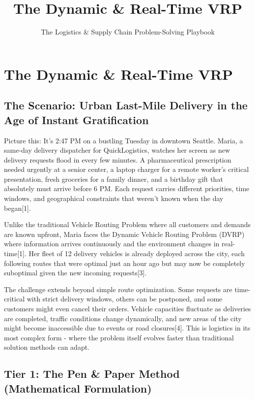 \documentclass{article}
\title{The Dynamic \& Real-Time VRP}
\author{The Logistics \& Supply Chain Problem-Solving Playbook}
\date{}
\begin{document}
\maketitle

\section{The Dynamic \& Real-Time VRP}

\subsection{The Scenario: Urban Last-Mile Delivery in the Age of Instant Gratification}

Picture this: It's 2:47 PM on a bustling Tuesday in downtown Seattle. Maria, a same-day delivery dispatcher for QuickLogistics, watches her screen as new delivery requests flood in every few minutes. A pharmaceutical prescription needed urgently at a senior center, a laptop charger for a remote worker's critical presentation, fresh groceries for a family dinner, and a birthday gift that absolutely must arrive before 6 PM. Each request carries different priorities, time windows, and geographical constraints that weren't known when the day began[1].

Unlike the traditional Vehicle Routing Problem where all customers and demands are known upfront, Maria faces the Dynamic Vehicle Routing Problem (DVRP) where information arrives continuously and the environment changes in real-time[1]. Her fleet of 12 delivery vehicles is already deployed across the city, each following routes that were optimal just an hour ago but may now be completely suboptimal given the new incoming requests[3].

The challenge extends beyond simple route optimization. Some requests are time-critical with strict delivery windows, others can be postponed, and some customers might even cancel their orders. Vehicle capacities fluctuate as deliveries are completed, traffic conditions change dynamically, and new areas of the city might become inaccessible due to events or road closures[4]. This is logistics in its most complex form - where the problem itself evolves faster than traditional solution methods can adapt.

\subsection{Tier 1: The Pen \& Paper Method (Mathematical Formulation)}
\end{document}
